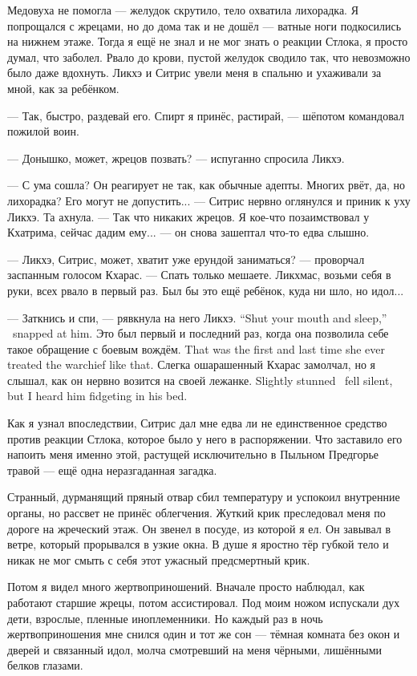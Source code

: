 Медовуха не помогла --- желудок скрутило, тело охватила лихорадка.
Я попрощался с жрецами, но до дома так и не дошёл --- ватные ноги подкосились на нижнем этаже.
Тогда я ещё не знал и не мог знать о реакции Стлока, я просто думал, что заболел.
Рвало до крови, пустой желудок сводило так, что невозможно было даже вдохнуть.
Ликхэ и Ситрис увели меня в спальню и ухаживали за мной, как за ребёнком.

--- Так, быстро, раздевай его.
Спирт я принёс, растирай, --- шёпотом командовал пожилой воин.

--- Донышко, может, жрецов позвать? --- испуганно спросила Ликхэ.

--- С ума сошла?
Он реагирует не так, как обычные адепты.
Многих рвёт, да, но лихорадка?
Его могут не допустить... --- Ситрис нервно оглянулся и приник к уху Ликхэ.
Та ахнула.
--- Так что никаких жрецов.
Я кое-что позаимствовал у Кхатрима, сейчас дадим ему... --- он снова зашептал что-то едва слышно.

--- Ликхэ, Ситрис, может, хватит уже ерундой заниматься? --- проворчал заспанным голосом Кхарас.
--- Спать только мешаете.
Ликхмас, возьми себя в руки, всех рвало в первый раз.
Был бы это ещё ребёнок, куда ни шло, но идол...

{--- Заткнись и спи, --- рявкнула на него Ликхэ.}
{``Shut your mouth and sleep,'' \Likchoe\ snapped at him.}
{Это был первый и последний раз, когда она позволила себе такое обращение с боевым вождём.}
{That was the first and last time she ever treated the warchief like that.}
{Слегка ошарашенный Кхарас замолчал, но я слышал, как он нервно возится на своей лежанке.}
{Slightly stunned \Kcharas\ fell silent, but I heard him fidgeting in his bed.}

Как я узнал впоследствии, Ситрис дал мне едва ли не единственное средство против реакции Стлока, которое было у него в распоряжении.
Что заставило его напоить меня именно этой, растущей исключительно в Пыльном Предгорье травой --- ещё одна неразгаданная загадка.

Странный, дурманящий пряный отвар сбил температуру и успокоил внутренние органы, но рассвет не принёс облегчения.
Жуткий крик преследовал меня по дороге на жреческий этаж.
Он звенел в посуде, из которой я ел.
Он завывал в ветре, который прорывался в узкие окна.
В душе я яростно тёр губкой тело и никак не мог смыть с себя этот ужасный предсмертный крик.

Потом я видел много жертвоприношений.
Вначале просто наблюдал, как работают старшие жрецы, потом ассистировал.
Под моим ножом испускали дух дети, взрослые, пленные иноплеменники.
Но каждый раз в ночь жертвоприношения мне снился один и тот же сон --- тёмная комната без окон и дверей и связанный идол, молча смотревший на меня чёрными, лишёнными белков глазами.

